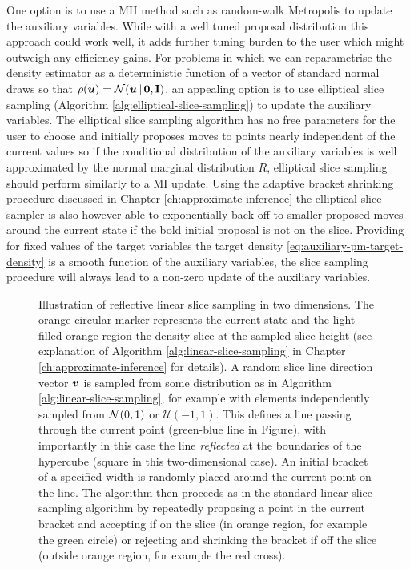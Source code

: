 One option is to use a \ac{MH} method such as random-walk Metropolis to update the auxiliary variables. While with a well tuned proposal distribution this approach could work well, it adds further tuning burden to the user which might outweigh any efficiency gains. For problems in which we can reparametrise the density estimator as a deterministic function of a vector of standard normal draws so that $\rho(\vct{u}) = \nrm{\vct{u} \gvn \vct{0},\mathbf{I}}$, an appealing option is to use elliptical slice sampling (Algorithm \ref{alg:elliptical-slice-sampling}) to update the auxiliary variables. The elliptical slice sampling algorithm has no free parameters for the user to choose and initially proposes moves to points nearly independent of the current values \citep{murray2010elliptical} so if the conditional distribution of the auxiliary variables is well approximated by the normal marginal distribution $R$, elliptical slice sampling should perform similarly to a \ac{MI} update. Using the adaptive bracket shrinking procedure discussed in Chapter \ref{ch:approximate-inference} the elliptical slice sampler is also however able to exponentially back-off to smaller proposed moves around the current state if the bold initial proposal is not on the slice. Providing for fixed values of the target variables the target density \eqref{eq:auxiliary-pm-target-density} is a smooth function of the auxiliary variables, the slice sampling procedure will always lead to a non-zero update of the auxiliary variables. %

\begin{figure}[t]
\centering
{}
\caption[Reflective linear slice sampling.]{Illustration of reflective linear slice sampling in two dimensions. The orange circular marker represents the current state and the light filled orange region the density slice at the sampled slice height (see explanation of Algorithm \ref{alg:linear-slice-sampling} in Chapter \ref{ch:approximate-inference} for details). A random slice line direction vector $\boldsymbol{v}$ is sampled from some distribution as in Algorithm \ref{alg:linear-slice-sampling}, for example with elements independently sampled from $\nrm{0,1}$ or $\mathcal{U}(-1,1)$. This defines a line passing through the current point (green-blue line in Figure), with importantly in this case the line \emph{reflected} at the boundaries of the hypercube (square in this two-dimensional case). An initial bracket of a specified width is randomly placed around the current point on the line. The algorithm then proceeds as in the standard linear slice sampling algorithm by repeatedly proposing a point in the current bracket and accepting if on the slice (in orange region, for example the green circle) or rejecting and shrinking the bracket if off the slice (outside orange region, for example the red cross).}
\label{fig:reflective-linear-slice-sampling}
\end{figure}

